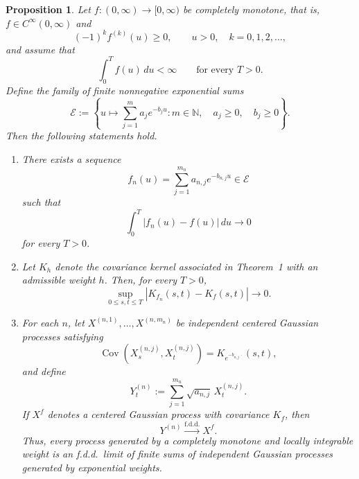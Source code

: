 \documentclass[preprint,12pt,authoryear]{elsarticle}
\newtheorem{prop}{Proposition}
\begin{document}
\begin{prop}
\label{prop:completely-monotone-approximation}
Let \(f:(0,\infty)\to[0,\infty)\) be completely monotone, that is,
\(f\in C^\infty(0,\infty)\) and
\[
(-1)^k f^{(k)}(u)\geq0,
\qquad
u>0,\quad k=0,1,2,\ldots,
\]
and assume that
\[
\int_0^T f(u)\,du<\infty
\qquad
\text{for every }T>0.
\]
Define the family of finite nonnegative exponential sums
\[
\mathcal{E}
:=
\left\{
u\longmapsto\sum_{j=1}^{m}a_j e^{-b_j u}
:
m\in\mathbb N,\quad a_j\geq0,\quad b_j\geq0
\right\}.
\]
Then the following statements hold.

\begin{enumerate}
\item[(i)]
There exists a sequence
\[
f_n(u)
=
\sum_{j=1}^{m_n}a_{n,j}e^{-b_{n,j}u}
\in\mathcal{E}
\]
such that
\[
\int_0^T|f_n(u)-f(u)|\,du
\longrightarrow0
\]
for every \(T>0\).

\item[(ii)]
Let \(K_h\) denote the covariance kernel associated in Theorem~1 with
an admissible weight \(h\). Then, for every \(T>0\),
\[
\sup_{0\leq s,t\leq T}
|K_{f_n}(s,t)-K_f(s,t)|
\longrightarrow0.
\]

\item[(iii)]
For each \(n\), let
\(X^{(n,1)},\ldots,X^{(n,m_n)}\) be independent centered Gaussian
processes satisfying
\[
\operatorname{Cov}
\left(
X^{(n,j)}_s,X^{(n,j)}_t
\right)
=
K_{e^{-b_{n,j}\,\cdot}}(s,t),
\]
and define
\[
Y^{(n)}_t
:=
\sum_{j=1}^{m_n}
\sqrt{a_{n,j}}\,X^{(n,j)}_t.
\]
If \(X^f\) denotes a centered Gaussian process with covariance \(K_f\),
then
\[
Y^{(n)}
\overset{\mathrm{f.d.d.}}{\longrightarrow}
X^f.
\]
Thus, every process generated by a completely monotone and locally
integrable weight is an f.d.d.\ limit of finite sums of independent
Gaussian processes generated by exponential weights.
\end{enumerate}
\end{prop}
\end{document}
